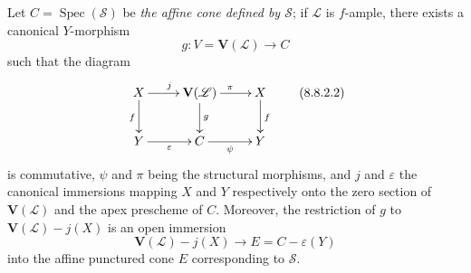 \begin{proposition}[8.8.2]
\label{II.8.8.2}
Let $C=\operatorname{Spec}(\mathcal{S})$ be \emph{the affine cone defined by
$\mathcal{S}$}; if $\mathcal{L}$ is $f$-ample, there exists a canonical
$Y$-morphism
\begin{equation}
\label{II.8.8.2.1}
  g:V=\mathbf{V}(\mathcal{L})\longrightarrow C
\tag{8.8.2.1}
\end{equation}
such that the diagram
\begin{equation}
\label{II.8.8.2.2}
  \xymatrix{
    X\ar[r]^{j}\ar[d]_{f} &
    \mathbf{V}(\mathcal{L})\ar[r]^{\pi}\ar[d]^{g} & X\ar[d]^{f}\\
    Y\ar[r]_{\varepsilon} & C\ar[r]_{\psi} & Y
  }
\tag{8.8.2.2}
\end{equation}
is commutative, $\psi$ and $\pi$ being the structural morphisms, and $j$ and
$\varepsilon$ the canonical immersions mapping $X$ and $Y$ respectively onto
the zero section of $\mathbf{V}(\mathcal{L})$ and the apex prescheme
of $C$. Moreover, the restriction of $g$ to
$\mathbf{V}(\mathcal{L})-j(X)$ is an open immersion
\begin{equation}
\label{II.8.8.2.3}
  \mathbf{V}(\mathcal{L})-j(X)\longrightarrow
  E=C-\varepsilon(Y)
\tag{8.8.2.3}
\end{equation}
into the affine punctured cone $E$ corresponding to $\mathcal{S}$.
\end{proposition}

